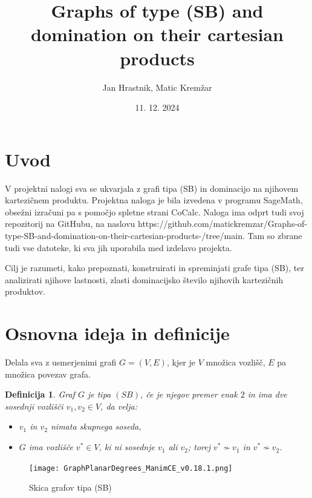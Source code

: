 \documentclass{article}
\begin{document}
\newtheorem{definition}{Definicija}


\title{Graphs of type (SB) and domination on their cartesian products}

\author{Jan Hrastnik, Matic Kremžar}
\date{11. 12. 2024}
\maketitle


\section{Uvod}
V projektni nalogi sva se ukvarjala z grafi tipa (SB) in dominacijo na njihovem kartezičnem produktu. 
Projektna naloga je bila izvedena v programu SageMath, obsežni izračuni pa s pomočjo spletne strani CoCalc.
Naloga ima odprt tudi svoj repozitorij na GitHubu, na naslovu https://github.com/matickremzar/Graphs-of-type-SB-and-domination-on-their-cartesian-products-/tree/main.
Tam so zbrane tudi vse datoteke, ki sva jih uporabila med izdelavo projekta.

Cilj je razumeti, kako prepoznati, konstruirati in spreminjati grafe tipa (SB), 
ter analizirati njihove lastnosti, zlasti dominacijsko število njihovih kartezičnih produktov.

\section{Osnovna ideja in definicije}
Delala sva z usmerjenimi grafi $G = (V,E)$, kjer je $V$ množica vozlišč, $E$ 
pa množica povezav grafa.

\begin{definition}
    Graf $G$ je tipa $(SB)$, če je njegov premer enak $2$ in ima dve sosednji vozlišči $v_1, v_2\in V$, da velja:
    \begin{itemize}
        \item $v_1$ in $v_2$ nimata skupnega soseda,
        \item $G$ ima vozlišče $v^*\in V$, ki ni sosednje $v_1$ ali $v_2$; torej $v^*\not\sim v_1$ in $v^*\not\sim v_2$. \newline
    \end{itemize}
\end{definition} 

\begin{figure}[h!]
    \centering
    \texttt{[image: GraphPlanarDegrees\_ManimCE\_v0.18.1.png]} %
    \caption{Skica grafov tipa (SB)}
    
\end{figure}
\end{document}
